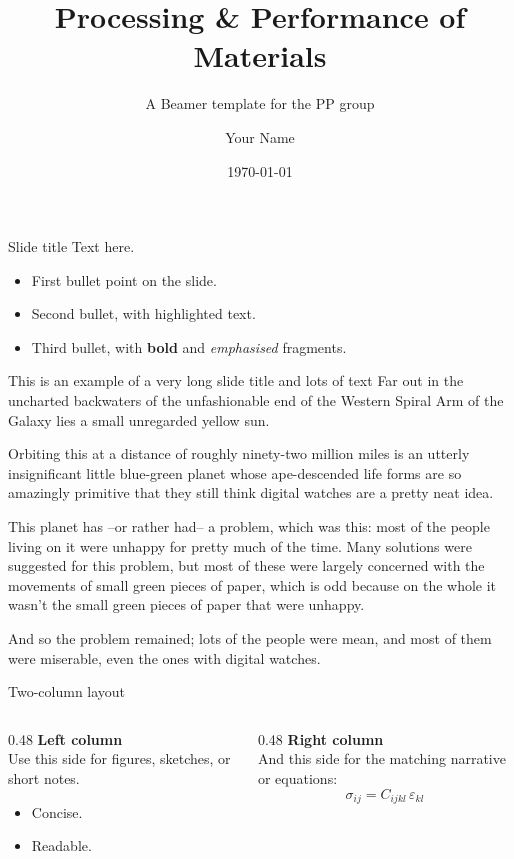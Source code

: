 \documentclass[aspectratio=169,11pt]{beamer}
\title{Processing \& Performance of Materials}
\subtitle{A Beamer template for the PP group}
\author{Your Name}
\institute{Eindhoven University of Technology}
\date{\today}
\begin{document}
\begin{frame}[plain]
  \titlepage
\end{frame}

\begin{frame}{Slide title}
  Text here.
  \begin{itemize}
    \item First bullet point on the slide.
    \item Second bullet, with \alert{highlighted} text.
    \item Third bullet, with \textbf{bold} and \emph{emphasised} fragments.
  \end{itemize}
\end{frame}

\begin{frame}{This is an example of a very long slide title and lots of text}
  Far out in the uncharted backwaters of the unfashionable end of the Western
  Spiral Arm of the Galaxy lies a small unregarded yellow sun.

  Orbiting this at a distance of roughly ninety-two million miles is an utterly
  insignificant little blue-green planet whose ape-descended life forms are so
  amazingly primitive that they still think digital watches are a pretty neat
  idea.

  This planet has --or rather had-- a problem, which was this: most of the
  people living on it were unhappy for pretty much of the time. Many solutions
  were suggested for this problem, but most of these were largely concerned
  with the movements of small green pieces of paper, which is odd because on
  the whole it wasn't the small green pieces of paper that were unhappy.

  And so the problem remained; lots of the people were mean, and most of them
  were miserable, even the ones with digital watches.
\end{frame}


\begin{frame}{Two-column layout}
  \begin{columns}[T,onlytextwidth]
    \begin{column}{0.48\textwidth}
      \textbf{Left column}\\[0.3em]
      Use this side for figures, sketches, or short notes.
      \begin{itemize}
        \item Concise.
        \item Readable.
      \end{itemize}
    \end{column}
    \begin{column}{0.48\textwidth}
      \textbf{Right column}\\[0.3em]
      And this side for the matching narrative or equations:
      \[
        \sigma_{ij} = C_{ijkl}\,\varepsilon_{kl}
      \]
    \end{column}
  \end{columns}
\end{frame}
\end{document}
